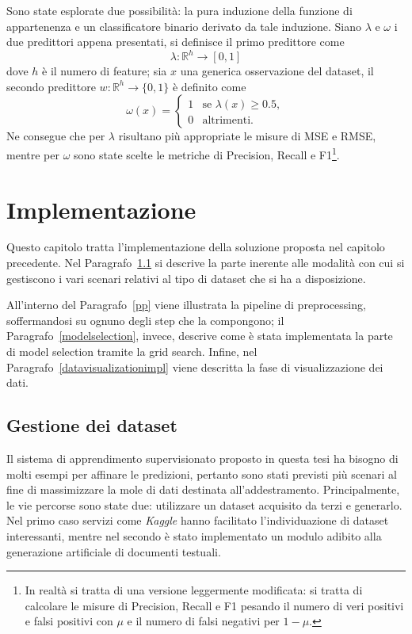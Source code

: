 \documentclass[12pt]{report}
\theoremstyle{definition}
\begin{document}
Sono state esplorate due possibilità: la pura induzione della funzione di appartenenza e un classificatore binario derivato da tale induzione.
Siano $\lambda$ e $\omega$ i due predittori appena presentati, si definisce il primo predittore come
\begin{equation}
    \lambda: \mathbb{R}^h \rightarrow [0,1]
\end{equation}
dove $h$ è il numero di feature; sia $x$ una generica osservazione del dataset, il secondo predittore $w: \mathbb R^h \rightarrow \{ 0, 1 \}$ è definito come
\begin{equation}
    \omega(x) = \begin{cases} 1 & \mbox{se } \lambda(x) \geq 0.5, \\ 0 & \mbox{altrimenti.} \end{cases}
\end{equation}
Ne consegue che per $\lambda$ risultano più appropriate le misure di MSE e RMSE, mentre per $\omega$ sono state scelte le metriche di Precision, Recall e F1\footnote{In realtà si tratta di una versione leggermente modificata: si tratta di calcolare le misure di Precision, Recall e F1 pesando il numero di veri positivi e falsi positivi con $\mu$ e il numero di falsi negativi per $1-\mu$.}.

\chapter{Implementazione}
\label{Capitolo 3}
\onehalfspacing
Questo capitolo tratta l'implementazione della soluzione proposta nel capitolo precedente. Nel Paragrafo~\ref{datasethandle} si descrive la parte inerente alle modalità con cui si gestiscono i vari scenari relativi al tipo di dataset che si ha a disposizione.

All'interno del Paragrafo~\ref{pp} viene illustrata la pipeline di preprocessing, soffermandosi su ognuno degli step che la compongono; il Paragrafo~\ref{modelselection}, invece, descrive come è stata implementata la parte di model selection tramite la grid search.
Infine, nel Paragrafo~\ref{datavisualizationimpl} viene descritta la fase di visualizzazione dei dati.

\section{Gestione dei dataset}\label{datasethandle}
Il sistema di apprendimento supervisionato proposto in questa tesi ha bisogno di molti esempi per affinare le predizioni, pertanto sono stati previsti più scenari al fine di massimizzare la mole di dati destinata all'addestramento. Principalmente, le vie percorse sono state due: utilizzare un dataset acquisito da terzi e generarlo.
Nel primo caso servizi come \textit{Kaggle} hanno facilitato l'individuazione di dataset interessanti, mentre nel secondo è stato implementato un modulo adibito alla generazione artificiale di documenti testuali.
\end{document}
